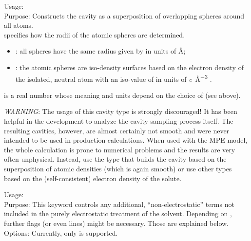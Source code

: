 {
  \noindent
  Usage:  
      \\[1.0ex] 
  Purpose: Constructs the cavity as a superposition of overlapping 
    spheres around all atoms. \\[1.0ex]
   specifies how the radii of the atomic spheres 
    are determined.
    \begin{itemize}
    \item {}: all spheres have the same radius
      given by  in units of \si{\angstrom};
    \item {}: the atomic spheres are iso-density surfaces 
      based on the electron density of the isolated, neutral atom 
      with an iso-value of  in units of 
      \si{\elementarycharge\per\cubic\angstrom} .
    \end{itemize} %
   is a real number whose meaning and units
    depend on the choice of  (see above). \\
}
\emph{WARNING}: The usage of this cavity type is strongly discouraged! 
It has been helpful in the development to analyze the cavity sampling 
process itself. The resulting cavities, however, are almost certainly 
not smooth and were never intended to be used in production calculations.
When used with the MPE model, the whole calculation is prone to numerical 
problems and the results are very often unphysical. 
Instead, use the  type that builds the cavity based on the
superposition of atomic densities (which is again smooth) or use other 
types based on the (self-consistent) electron density of the solute. 


{
  \noindent
  Usage:   \\[1.0ex] 
  Purpose: This keyword controls any additional, ``non-electrostatic'' terms 
    not included in the purely electrostatic treatment of the solvent. 
    Depending on , further flags (or even lines) might be 
    necessary. Those are explained below. \\[1.0ex]
  Options: Currently, only  is supported. \\
}

